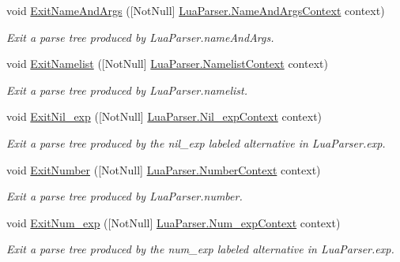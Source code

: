 \begin{DoxyCompactItemize}
void \mbox{\hyperlink{classzlua_1_1_compiler_afa2dba6f3e7fb7b060741a58bdac97f4}{Exit\+Name\+And\+Args}} (\mbox{[}Not\+Null\mbox{]} \mbox{\hyperlink{classzlua_1_1_lua_parser_1_1_name_and_args_context}{Lua\+Parser.\+Name\+And\+Args\+Context}} context)
\begin{DoxyCompactList}\small\item\em Exit a parse tree produced by Lua\+Parser.\+name\+And\+Args. \end{DoxyCompactList}\item 
void \mbox{\hyperlink{classzlua_1_1_compiler_ad35fb734ce46c317f3d6005186ff5a11}{Exit\+Namelist}} (\mbox{[}Not\+Null\mbox{]} \mbox{\hyperlink{classzlua_1_1_lua_parser_1_1_namelist_context}{Lua\+Parser.\+Namelist\+Context}} context)
\begin{DoxyCompactList}\small\item\em Exit a parse tree produced by Lua\+Parser.\+namelist. \end{DoxyCompactList}\item 
void \mbox{\hyperlink{classzlua_1_1_compiler_a1ec231e95547be0d28e8d1f30f4872ba}{Exit\+Nil\+\_\+exp}} (\mbox{[}Not\+Null\mbox{]} \mbox{\hyperlink{classzlua_1_1_lua_parser_1_1_nil__exp_context}{Lua\+Parser.\+Nil\+\_\+exp\+Context}} context)
\begin{DoxyCompactList}\small\item\em Exit a parse tree produced by the {\ttfamily nil\+\_\+exp} labeled alternative in Lua\+Parser.\+exp. \end{DoxyCompactList}\item 
void \mbox{\hyperlink{classzlua_1_1_compiler_a89a20cafde0ae8bc4079c91635b47c5f}{Exit\+Number}} (\mbox{[}Not\+Null\mbox{]} \mbox{\hyperlink{classzlua_1_1_lua_parser_1_1_number_context}{Lua\+Parser.\+Number\+Context}} context)
\begin{DoxyCompactList}\small\item\em Exit a parse tree produced by Lua\+Parser.\+number. \end{DoxyCompactList}\item 
void \mbox{\hyperlink{classzlua_1_1_compiler_a3a76d8ff765978e61655469c1277c65e}{Exit\+Num\+\_\+exp}} (\mbox{[}Not\+Null\mbox{]} \mbox{\hyperlink{classzlua_1_1_lua_parser_1_1_num__exp_context}{Lua\+Parser.\+Num\+\_\+exp\+Context}} context)
\begin{DoxyCompactList}\small\item\em Exit a parse tree produced by the {\ttfamily num\+\_\+exp} labeled alternative in Lua\+Parser.\+exp. \end{DoxyCompactList}\item 

\end{DoxyCompactItemize}
